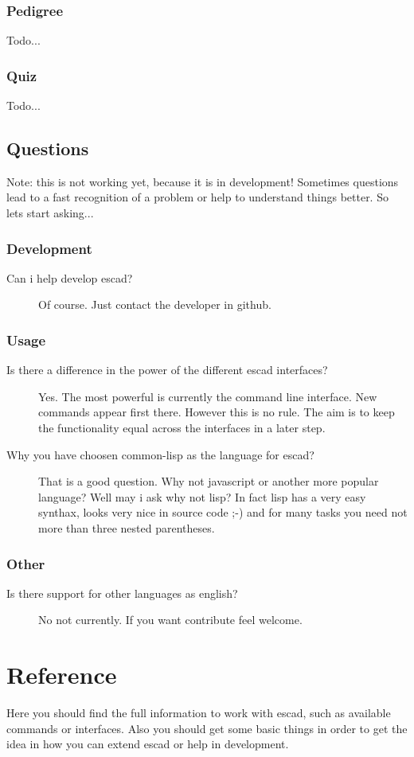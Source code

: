 \documentclass[a4paper, 12pt, openany]{scrbook}
\begin{document}
\subsection{Pedigree}
Todo...
\subsection{Quiz}
Todo...
\section{Questions}
Note: this is not working yet, because it is in development!
Sometimes questions lead to a fast recognition of a problem or help to understand things better. So lets start asking...
\subsection{Development}
\begin{description}
\item[Can i help develop escad?] Of course. Just contact the developer in github.
\end{description}
\subsection{Usage}
\begin{description}
\item[Is there a difference in the power of the different escad interfaces?] Yes. The most powerful is currently the command line interface. New commands appear first there. However this is no rule. The aim is to keep the functionality equal across the interfaces in a later step.
\item[Why you have choosen common-lisp as the language for escad?] That is a good question. Why not javascript or another more popular language? Well may i ask why not lisp? In fact lisp has a very easy synthax, looks very nice in source code ;-) and for many tasks you need not more than three nested parentheses.
\end{description}
\subsection{Other}
\begin{description}
\item[Is there support for other languages as english?]  No not currently. If you want contribute feel welcome.
\end{description}
\chapter{Reference}
Here you should find the full information to work with escad, such as available commands or interfaces. Also you should get some basic things in order to get the idea in how you can extend escad or help in development.
\end{document}
